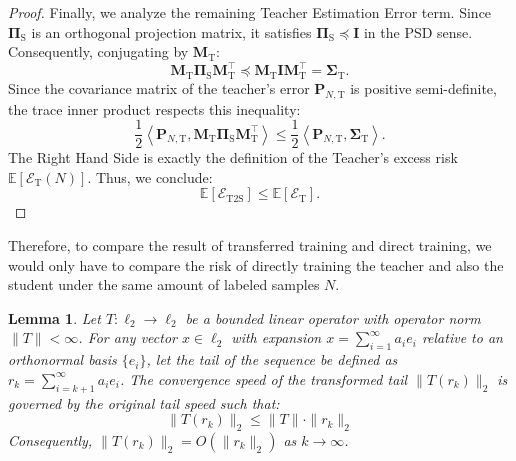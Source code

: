 \documentclass{article}
\theoremstyle{definition}
\theoremstyle{definition}
\theoremstyle{plain}
\theoremstyle{plain}
\theoremstyle{plain}
\newtheorem{lemma}{Lemma}
\theoremstyle{plain}
\theoremstyle{plain}
\newcommand{\bs}[1]{\boldsymbol{\mathbf{#1}}}
\newcommand{\Ex}{\mathbb{E}}
\newcommand{\te}{\mathrm{T}}
\newcommand{\st}{\mathrm{S}}
\newcommand{\M}{\mathbf{M}}
\newcommand{\id}{\mathbf{I}}
\newcommand{\inner}[1]{\left\langle#1\right\rangle}
\begin{document}
\begin{proof}
    Finally, we analyze the remaining Teacher Estimation Error term. Since $\bs \Pi_\st$ is an orthogonal projection matrix, it satisfies $\bs \Pi_\st \preceq \id$ in the PSD sense. Consequently, conjugating by $\M_\te$:
    \begin{equation}
        \M_\te \bs \Pi_\st \M_\te^\top \preceq \M_\te \id \M_\te^\top = \bs \Sigma_\te.
    \end{equation}
    Since the covariance matrix of the teacher's error $\bs P_{N,\te}$ is positive semi-definite, the trace inner product respects this inequality:
    \begin{equation}
        \frac{1}{2}\inner{\bs P_{N,\te},\M_\te\bs \Pi_{\st}\M_\te^\top} \leq \frac{1}{2}\inner{\bs P_{N,\te},\bs \Sigma_\te}.
    \end{equation}
    The Right Hand Side is exactly the definition of the Teacher's excess risk $\Ex[\mathcal{E}_{\mathrm{T}}(N)]$. Thus, we conclude:
    \begin{equation}
        \Ex[\mathcal{E}_{\mathrm{T2S}}] \leq \Ex[\mathcal{E}_{\mathrm{T}}].
    \end{equation}
\end{proof}

Therefore, to compare the result of transferred training and direct training, we would only have to compare the risk of directly training the teacher and also the student under the same amount of labeled samples $N$.

\begin{lemma}
\label{lem:convergencespeedequiv}
Let $T: \ell_2 \to \ell_2$ be a bounded linear operator with operator norm $\|T\| < \infty$. For any vector $x \in \ell_2$ with expansion $x = \sum_{i=1}^{\infty} a_i e_i$ relative to an orthonormal basis $\{e_i\}$, let the tail of the sequence be defined as $r_k = \sum_{i=k+1}^{\infty} a_i e_i$. The convergence speed of the transformed tail $\|T(r_k)\|_2$ is governed by the original tail speed such that:
\begin{equation}
    \|T(r_k)\|_2 \leq \|T\| \cdot \|r_k\|_2
\end{equation}
Consequently, $\|T(r_k)\|_2 = O(\|r_k\|_2)$ as $k \to \infty$.
\end{lemma}
\end{document}
